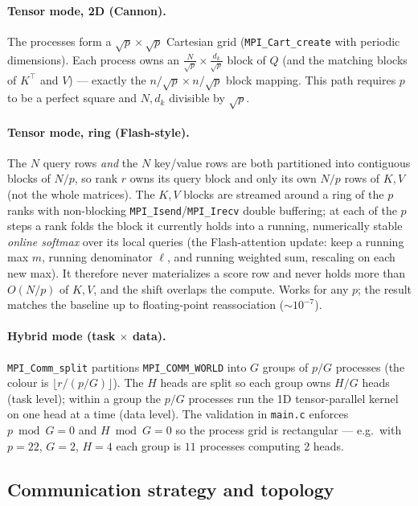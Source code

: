 \documentclass[11pt,a4paper]{article}
\newcommand{\code}[1]{\texttt{#1}}
\begin{document}
\paragraph{Tensor mode, 2D (Cannon).}
The processes form a $\sqrt{p}\times\sqrt{p}$ Cartesian grid
(\code{MPI\_Cart\_create} with periodic dimensions). Each process owns an
$\frac{N}{\sqrt{p}}\times\frac{d_k}{\sqrt{p}}$ block of $Q$ (and the matching
blocks of $K^{\top}$ and $V$) --- exactly the
$n/\sqrt{p}\times n/\sqrt{p}$ block mapping. This path requires $p$ to be a
perfect square and $N,d_k$ divisible by $\sqrt{p}$.

\paragraph{Tensor mode, ring (Flash-style).}
The $N$ query rows \emph{and} the $N$ key/value rows are both partitioned into
contiguous blocks of $N/p$, so rank $r$ owns its query block and only its own
$N/p$ rows of $K,V$ (not the whole matrices). The $K,V$ blocks are streamed around
a ring of the $p$ ranks with non-blocking \code{MPI\_Isend}/\code{MPI\_Irecv}
double buffering; at each of the $p$ steps a rank folds the block it currently
holds into a running, numerically stable \emph{online softmax} over its local
queries (the Flash-attention update: keep a running max $m$, running denominator
$\ell$, and running weighted sum, rescaling on each new max). It therefore never
materializes a score row and never holds more than $O(N/p)$ of $K,V$, and the
shift overlaps the compute. Works for any $p$; the result matches the baseline up
to floating-point reassociation ($\sim10^{-7}$).

\paragraph{Hybrid mode (task $\times$ data).}
\code{MPI\_Comm\_split} partitions \code{MPI\_COMM\_WORLD} into
$G$ groups of $p/G$ processes (the colour is $\lfloor r/(p/G)\rfloor$). The $H$
heads are split so each group owns $H/G$ heads (task level); within a group the
$p/G$ processes run the 1D tensor-parallel kernel on one head at a time (data
level). The validation in \code{main.c} enforces $p \bmod G = 0$ and
$H \bmod G = 0$ so the process grid is rectangular --- e.g.\ with $p=22$, $G=2$,
$H=4$ each group is $11$ processes computing $2$ heads.

\subsection{Communication strategy and topology}
\label{sec:comm}
\end{document}

